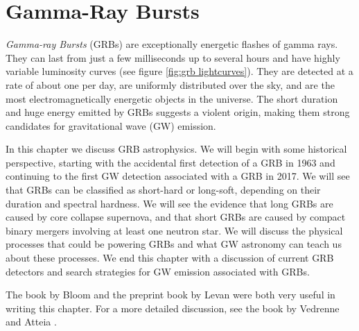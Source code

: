 \documentclass[11pt]{cuthesis}
\begin{document}
\chapter{Gamma-Ray Bursts} \label{chap:GRBs}
\textit{Gamma-ray Bursts} (GRBs) are exceptionally energetic flashes of gamma rays. They can last from just a few milliseconds up to several hours and have highly variable luminosity curves (see figure \ref{fig:grb lightcurves}). They are detected at a rate of about one per day, are uniformly distributed over the sky, and are the most electromagnetically energetic objects in the universe. The short duration and huge energy emitted by GRBs suggests a violent origin, making them strong candidates for gravitational wave (GW) emission.

In this chapter we discuss GRB astrophysics. We will begin with some historical perspective, starting with the accidental first detection of a GRB in 1963 and continuing to the first GW detection associated with a GRB in 2017. We will see that GRBs can be classified as short-hard or long-soft, depending on their duration and spectral hardness. We will see the evidence that long GRBs are caused by core collapse supernova, and that short GRBs are caused by compact binary mergers involving at least one neutron star. We will discuss the physical processes that could be powering GRBs and what GW astronomy can teach us about these processes. We end this chapter with a discussion of current GRB detectors and search strategies for GW emission associated with GRBs.

The book by Bloom \cite{bloom_grbs} and the preprint book by Levan \cite{levan_grbs} were both very useful in writing this chapter. For a more detailed discussion, see the book by Vedrenne and Atteia \cite{vedrenne_gamma-ray}.
\end{document}
